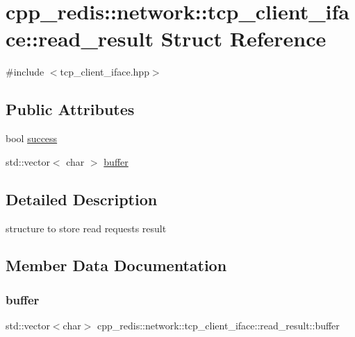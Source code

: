 \hypertarget{structcpp__redis_1_1network_1_1tcp__client__iface_1_1read__result}{}\section{cpp\+\_\+redis\+:\+:network\+:\+:tcp\+\_\+client\+\_\+iface\+:\+:read\+\_\+result Struct Reference}
\label{structcpp__redis_1_1network_1_1tcp__client__iface_1_1read__result}


{\ttfamily \#include $<$tcp\+\_\+client\+\_\+iface.\+hpp$>$}

\subsection*{Public Attributes}
\begin{DoxyCompactItemize}
\item 
bool \hyperlink{structcpp__redis_1_1network_1_1tcp__client__iface_1_1read__result_ab9a3a54474c382a00323ed02f4239faa}{success}
\item 
std\+::vector$<$ char $>$ \hyperlink{structcpp__redis_1_1network_1_1tcp__client__iface_1_1read__result_af8275097ebe558e7ce0f2aa29131cb05}{buffer}
\end{DoxyCompactItemize}


\subsection{Detailed Description}
structure to store read requests result 

\subsection{Member Data Documentation}
\mbox{\label{structcpp__redis_1_1network_1_1tcp__client__iface_1_1read__result_af8275097ebe558e7ce0f2aa29131cb05}} 
\subsubsection{\texorpdfstring{buffer}{buffer}}
{\footnotesize\ttfamily std\+::vector$<$char$>$ cpp\+\_\+redis\+::network\+::tcp\+\_\+client\+\_\+iface\+::read\+\_\+result\+::buffer}

